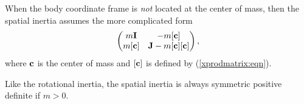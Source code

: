 When the body coordinate frame is {\it not} located at the center of
mass, then the spatial inertia assumes the more complicated form
%
\begin{equation}
\left(\begin{matrix} 
m {\bf I} & -m [{\bf c}] \\ m [{\bf c}] & {\bf J} - m[{\bf c}][{\bf c}]
\end{matrix}\right),
\end{equation}
%
where ${\bf c}$ is the center of mass and $[{\bf c}]$ is defined by
(\ref{xprodmatrix:eqn}).

Like the rotational inertia, the spatial inertia is always symmetric
positive definite if $m > 0$.

\ifdefined\maindoc
\else

\fi
